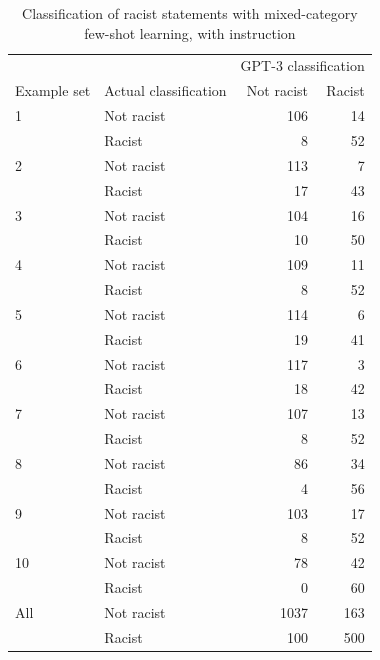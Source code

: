 \documentclass[12pt,]{article}
\begin{document}
\begin{table}[!h]

\caption{\label{tab:fewshotmixedinstruct-racism}Classification of racist statements with mixed-category few-shot learning, with instruction}
\centering
\fontsize{8}{10}\selectfont
\begin{tabular}[t]{llrr}
\toprule
\multicolumn{2}{c}{ } & \multicolumn{2}{c}{GPT-3 classification} \\
\cmidrule(l{3pt}r{3pt}){3-4}
Example set & Actual classification & Not racist & Racist\\
\midrule
1 & Not racist & 106 & 14\\
 & Racist & 8 & \vphantom{3} 52\\
\midrule
2 & Not racist & 113 & 7\\
 & Racist & 17 & 43\\
\midrule
3 & Not racist & 104 & 16\\
 & Racist & 10 & 50\\
\midrule
4 & Not racist & 109 & 11\\
 & Racist & 8 & \vphantom{2} 52\\
\midrule
5 & Not racist & 114 & 6\\
 & Racist & 19 & 41\\
\midrule
6 & Not racist & 117 & 3\\
 & Racist & 18 & 42\\
\midrule
7 & Not racist & 107 & 13\\
 & Racist & 8 & \vphantom{1} 52\\
\midrule
8 & Not racist & 86 & 34\\
 & Racist & 4 & 56\\
\midrule
9 & Not racist & 103 & 17\\
 & Racist & 8 & 52\\
\midrule
10 & Not racist & 78 & 42\\
 & Racist & 0 & 60\\
\midrule
All & Not racist & 1037 & 163\\
 & Racist & 100 & 500\\
\bottomrule
\end{tabular}
\end{table}
\end{document}
